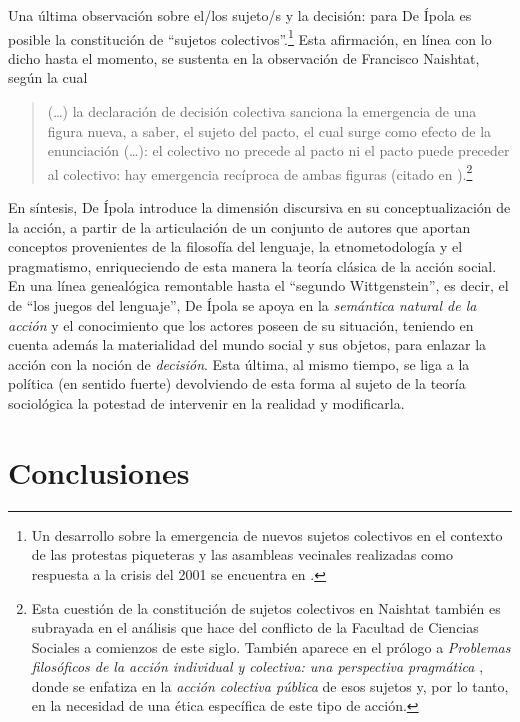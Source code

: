 Una última observación sobre el/los sujeto/s y la decisión: para De Ípola es posible la constitución de \enquote{sujetos colectivos}.\footnote{Un desarrollo sobre la emergencia de nuevos sujetos colectivos en el contexto de las protestas piqueteras y las asambleas vecinales realizadas como respuesta a la crisis del 2001 se encuentra en \textcite{1611-DEIPOLA2004}.} Esta afirmación, en línea con lo dicho hasta el momento, se sustenta en la observación de Francisco Naishtat, según la cual

\begin{quote}
(\dots) la declaración de decisión colectiva sanciona la emergencia de una figura nueva, a saber, el sujeto del pacto, el cual surge como efecto de la enunciación (\dots): el colectivo no precede al pacto ni el pacto puede preceder al colectivo: hay emergencia recíproca de ambas figuras (citado en \cite[83]{1600-DEIPOLA2001}).\footnote{Esta cuestión de la constitución de sujetos colectivos en Naishtat también es subrayada en el análisis que  hace del conflicto de la Facultad de Ciencias Sociales a comienzos de este siglo. También aparece en el prólogo a \emph{Problemas filosóficos de la acción individual y colectiva: una perspectiva pragmática} \parencite{1612-DEIPOLA2005}, donde se enfatiza en la \emph{acción colectiva pública} de esos sujetos y, por lo tanto, en la necesidad de una ética específica de este tipo de acción.}
\end{quote}

En síntesis, De Ípola introduce la dimensión discursiva en su conceptualización de la acción, a partir de la articulación de un conjunto de autores que aportan conceptos provenientes de la filosofía del lenguaje, la etnometodología y el pragmatismo, enriqueciendo de esta manera la teoría clásica de la acción social. En una línea genealógica remontable hasta el \enquote{segundo Wittgenstein}, es decir, el de \enquote{los juegos del lenguaje}, De Ípola se apoya en la \emph{semántica natural de la acción} y el conocimiento que los actores poseen de su situación, teniendo en cuenta además la materialidad del mundo social y sus objetos, para enlazar la acción con la noción de \emph{decisión}. Esta última, al mismo tiempo, se liga a la política (en sentido fuerte) devolviendo de esta forma al sujeto de la teoría sociológica la potestad de intervenir en la realidad y modificarla.

\section{Conclusiones}

